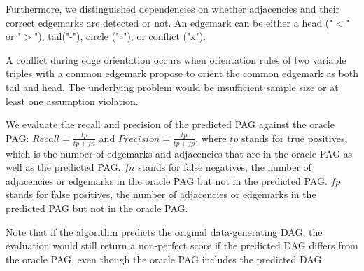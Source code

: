 \documentclass[conference]{IEEEtran}
\begin{document}
Furthermore, we distinguished dependencies on whether adjacencies and their correct edgemarks are detected or not. An edgemark can be either a head ("$<$" or "$>$"), tail("-"), circle ("$\circ$"), or conflict ("x").

A conflict during edge orientation occurs when orientation rules of two variable triples with a common edgemark propose to orient the common edgemark as both tail and head\cite{runge_pcmci_2020}. The underlying problem would be insufficient sample size or at least one assumption violation\cite{runge_tigramite_2022}.


We evaluate the recall and precision of the predicted PAG against the oracle PAG:
$Recall = \frac{tp}{tp+fn}$ and $Precision = \frac{tp}{tp+fp}$, where
$tp$ stands for true positives, which is the number of edgemarks and adjacencies that are in the oracle PAG as well as the predicted PAG.
$fn$ stands for false negatives,  the number of adjacencies or edgemarks in the oracle PAG but not in the predicted PAG.
$fp$ stands for false positives, the number of adjacencies or edgemarks in the predicted PAG but not in the oracle PAG.

Note that if the algorithm predicts the original data-generating DAG, the evaluation would still return a non-perfect score if the predicted DAG differs from the oracle PAG, even though the oracle PAG includes the predicted DAG.
\end{document}
